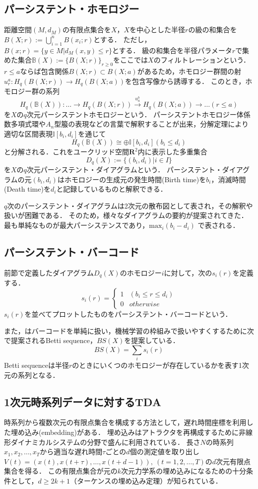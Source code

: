 \documentclass{jarticle}
\begin{document}
\subsection{パーシステント・ホモロジー}
距離空間$(M, d_M)$の有限点集合を$X$，$X$を中心とした半径$r$の級の和集合を$B(X;r):=\bigcup_{i=1}^n B(x_i;r)$とする．
ただし，$B(x;r) =\{y \in M | d_M(x,y) \leq r\}$とする．
級の和集合を半径パラメータ$r$で集めた集合$\mathbb B(X):=\{B(X;r)\}_{r\geq 0}$をここでは$X$のフィルトレーションという．
$r\leq a$ならば包含関係$B(X;r)\subset B(X;a)$があるため，ホモロジー群間の射$u_r^a : H_q(B(X;r))\rightarrow H_q(B(X;a)) $を包含写像から誘導する．
このとき，ホモロジー群の系列
$$
H_q(\mathbb B(X)):\dots\rightarrow H_q(B(X;r))\overset{u_a^b}{\rightarrow} H_q(B(X;a))\rightarrow\dots (r\leq a)
$$
を$X$の$q$次元パーシステントホモロジーという．
パーシステントホモロジー体係数多項式環や$A_n$型箙の表現などの言葉で解釈することが出来，分解定理により適切な区間表現$\mathbb I[b_i, d_i] $を通じて
$$
H_q(\mathbb B(X))\cong\oplus\mathbb I[b_i,d_i] (b_i\leq d_i)
$$
と分解される．これをユークリッド空間$\mathbf R^2$内に表示した多重集合
$$
D_q(X):= \{(b_i,d_i) | i \in I\}
$$
を$X$の$q$次元パーシステント・ダイアグラムという．
パーシステント・ダイアグラムの元$(b_i, d_i)$はホモロジーの生成元の発生時間(Birth time)を$b_i$，消滅時間(Death time)を$d_i$と記録しているものと解釈できる．

$q$次のパーシステント・ダイアグラムは2次元の散布図として表され，その解釈や扱いが困難である．
そのため，様々なダイアグラムの要約が提案されてきた．
最も単純なものが最大パーシステンスであり，$\text{max}_i(b_i - d_i)$
で表される．

\subsection{パーシステント・バーコード}
前節で定義したダイアグラム$D_q(X)$のホモロジー$i$に対して，次の$s_i(r)$を定義する．
$$
s_i(r) = 
\begin{cases}
1 & (b_i \leq r \leq d_i)\\
0 & otherwise
\end{cases}
$$
$s_i(r)$を並べてプロットしたものをパーシステント・バーコードという．

また，\cite{Umeda2017}はバーコードを単純に扱い，機械学習の枠組みで扱いやすくするために次で提案されるBetti sequence，$BS(X)$を提案している．
$$
BS(X) = \sum_i s_i(r)
$$
Betti sequenceは半径$r$のときにいくつのホモロジーが存在しているかを表す1次元の系列となる．

\subsection{1次元時系列データに対するTDA}
時系列から複数次元の有限点集合を構成する方法として，遅れ時間座標を利用した埋め込み(embedding)がある．
埋め込みはアトラクタを再構成するために非線形ダイナミカルシステムの分野で盛んに利用されている．
長さ$N$の時系列$x_1, x_2, \dots , x_T$から適当な遅れ時間$\tau$ごとの$d$個の測定値を取り出し$V(t) = (x(t), x(t+\tau), \dots, x(t + d - 1)),\ (t = 1,2,\dots, T)$の$d$次元有限点集合を得る．
この有限点集合が元の$k$次元力学系の埋め込みになるための十分条件として，$d\geq 2k+1$（ターケンスの埋め込み定理）が知られている．
\end{document}
